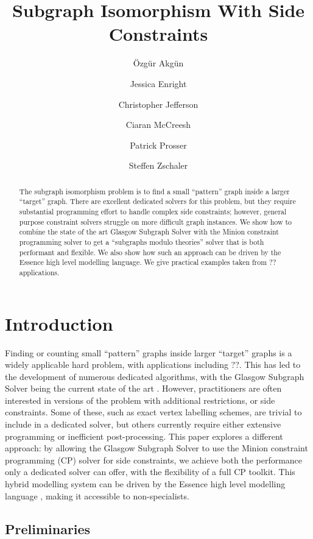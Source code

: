 \documentclass[runningheads]{llncs}
\title{Subgraph Isomorphism With Side Constraints}
\author{
    \"Ozg\"ur Akg\"un\inst{1} \and Jessica Enright\inst{2} \and Christopher
    Jefferson\inst{1} \and Ciaran McCreesh\inst{2} \and Patrick
    Prosser\inst{2} \and Steffen Zschaler\inst{3} \\
}
\institute{
    University of St Andrews, Scotland \and
    University of Glasgow, Scotland \\ \email{ciaran.mccreesh@glasgow.ac.uk} \and
    King's College London, England
}
\begin{document}
\maketitle

\begin{abstract}
    The subgraph isomorphism problem is to find a small ``pattern'' graph inside a larger ``target''
    graph. There are excellent dedicated solvers for this problem, but they require substantial
    programming effort to handle complex side constraints; however, general purpose constraint
    solvers struggle on more difficult graph instances. We show how to combine the state of the art
    Glasgow Subgraph Solver with the Minion constraint programming solver to get a ``subgraphs modulo
    theories'' solver that is both performant and flexible. We also show how such an approach can be
    driven by the Essence high level modelling language. We give practical examples taken from
    ??applications.
\end{abstract}

\section{Introduction}

Finding or counting small ``pattern'' graphs inside larger ``target'' graphs is a widely applicable
hard problem, with applications including ??. This has led to the development of numerous dedicated
algorithms, with the Glasgow Subgraph Solver \cite{DBLP:conf/gg/McCreeshP020} being the current
state of the art \cite{DBLP:conf/gbrpr/Solnon19}. However, practitioners are often interested in
versions of the problem with additional restrictions, or side constraints. Some of these, such as
exact vertex labelling schemes, are trivial to include in a dedicated solver, but others currently
require either extensive programming or inefficient post-processing. This paper explores a different
approach: by allowing the Glasgow Subgraph Solver to use the Minion constraint programming (CP) solver
\cite{DBLP:conf/ecai/GentJM06} for side constraints, we achieve both the performance only a
dedicated solver can offer, with the flexibility of a full CP toolkit. This
hybrid modelling system can be driven by the Essence high level modelling language
\cite{DBLP:journals/constraints/FrischHJHM08}, making it accessible to non-specialists.

\subsection{Preliminaries}
\end{document}
